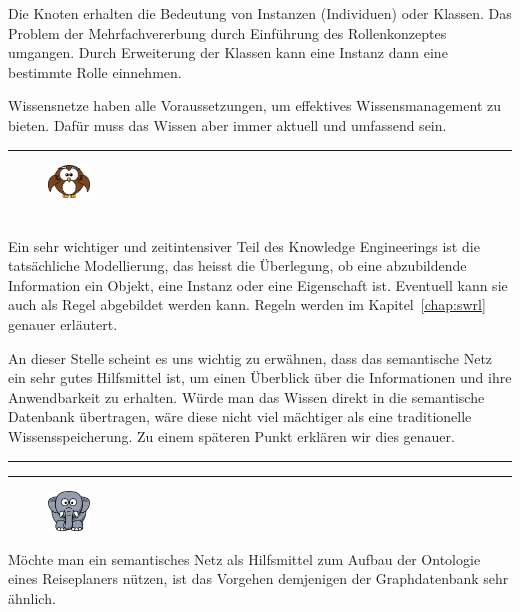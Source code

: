 Die Knoten erhalten die Bedeutung von Instanzen (Individuen) oder Klassen. Das Problem der Mehrfachvererbung durch Einführung des Rollenkonzeptes umgangen. Durch Erweiterung der Klassen kann eine Instanz dann eine bestimmte Rolle einnehmen.

Wissensnetze haben alle Voraussetzungen, um effektives Wissensmanagement zu bieten. Dafür muss das Wissen aber immer aktuell und umfassend sein.

\newpage

\noindent\rule[1ex]{\textwidth}{1pt}
\begin{figure}
    \vspace{-2pt}
    \includegraphics[width=0.1\textwidth]{bilder/owl.png}
\end{figure}\\
Ein sehr wichtiger und zeitintensiver Teil des Knowledge Engineerings ist die tatsächliche Modellierung, das heisst die Überlegung, ob eine abzubildende Information ein Objekt, eine Instanz oder eine Eigenschaft ist. Eventuell kann sie auch als Regel abgebildet werden kann. Regeln werden im Kapitel~\ref{chap:swrl}  genauer erläutert.

An dieser Stelle scheint es uns wichtig zu erwähnen, dass das semantische Netz ein sehr gutes Hilfsmittel ist, um einen Überblick über die Informationen und ihre Anwendbarkeit zu erhalten. Würde man das Wissen direkt in die semantische Datenbank übertragen, wäre diese nicht viel mächtiger als eine traditionelle Wissensspeicherung. Zu einem späteren Punkt erklären wir dies genauer.

\noindent\rule[1ex]{\textwidth}{1pt}


\noindent\rule[1ex]{\textwidth}{1pt}
\begin{figure}
    \vspace{-12pt}
    \includegraphics[width=0.1\textwidth]{bilder/elephant.png}
\end{figure}
Möchte man ein semantisches Netz als Hilfsmittel zum Aufbau der Ontologie eines Reiseplaners nützen, ist das Vorgehen demjenigen der Graphdatenbank sehr ähnlich.

